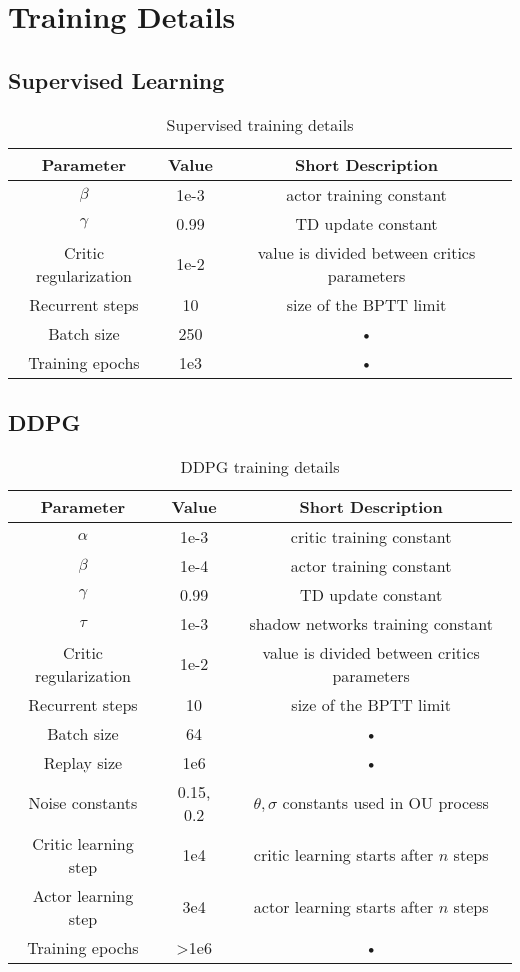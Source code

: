 \chapter{Training Details}
\section{Supervised Learning}
\begin{table}[htbp]
\begin{tabular}{|c|c|c|}
\hline 
Parameter & Value & Short Description \\ 
\hline \hline 
$\beta$ & 1e-3 & actor training constant \\ 
\hline 
$\gamma$ & 0.99 & TD update constant \\ 
\hline 
Critic regularization & 1e-2 & value is divided between critics parameters \\ 
\hline 
Recurrent steps & 10 & size of the BPTT limit \\ 
\hline 
Batch size & 250 & • \\ 
\hline 
Training epochs & 1e3 & • \\ 
\hline 
\end{tabular}
\caption{Supervised training details}
\label{tab:supervised}
\end{table}

\section{DDPG}

\begin{table}[htbp]
\begin{tabular}{|c|c|c|}
\hline 
Parameter & Value & Short Description \\ 
\hline \hline 
$\alpha$ & 1e-3 & critic training constant \\ 
\hline 
$\beta$ & 1e-4 & actor training constant \\ 
\hline 
$\gamma$ & 0.99 & TD update constant \\ 
\hline 
$\tau$ & 1e-3 & shadow networks training constant \\ 
\hline 
Critic regularization & 1e-2 & value is divided between critics parameters \\ 
\hline 
Recurrent steps & 10 & size of the BPTT limit \\ 
\hline 
Batch size & 64 & • \\ 
\hline 
Replay size & 1e6 & • \\ 
\hline 
Noise constants & 0.15, 0.2 & $\theta, \sigma$ constants used in OU process \\ 
\hline 
Critic learning step & 1e4 & critic learning starts after $n$ steps \\ 
\hline 
Actor learning step & 3e4 & actor learning starts after $n$ steps \\ 
\hline
Training epochs & >1e6 & • \\ 
\hline 
\end{tabular}
\caption{DDPG training details}
\label{tab:ddpg}
\end{table}

